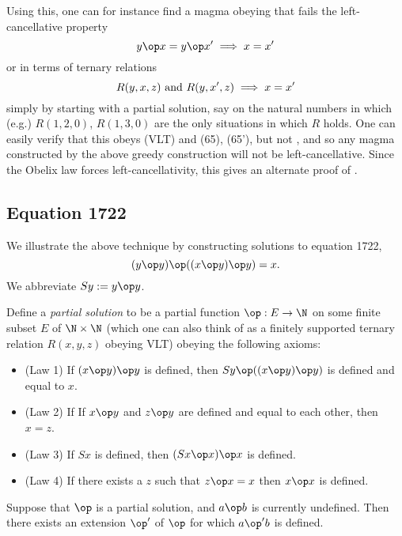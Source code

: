 Using this, one can for instance find a magma obeying  that fails the left-cancellative property
$$ y \op x = y \op x' \implies x=x'$$
or in terms of ternary relations
\begin{equation}\label{left-inject}
   R(y,x,z) \hbox{ and } R(y,x',z) \implies x=x'
\end{equation}
simply by starting with a partial solution, say on the natural numbers in which (e.g.) $R(1,2,0)$, $R(1,3,0)$ are the only situations in which $R$ holds.  One can easily verify that this obeys (VLT) and (65), (65'), but not , and so any magma constructed by the above greedy construction will not be left-cancellative.  Since the Obelix law  forces left-cancellativity, this gives an alternate proof of .

\subsection{Equation 1722}

We illustrate the above technique by constructing solutions to equation 1722,
\begin{equation}\label{1722}
  (y \op y) \op ((x \op y) \op y) = x.
\end{equation}
We abbreviate $Sy := y \op y$.

Define a \emph{partial solution} to be a partial function $\op: E \to \N$ on some finite subset $E$ of $\N \times \N$ (which one can also think of as a finitely supported ternary relation $R(x,y,z)$ obeying VLT) obeying the following axioms:
\begin{itemize}
\item (Law 1) If $(x \op y) \op y$ is defined, then $Sy \op ((x \op y) \op y)$ is defined and equal to $x$.
\item (Law 2) If  If $x \op y$ and $z \op y$ are defined and equal to each other, then $x=z$.
\item (Law 3) If $Sx$ is defined, then $(Sx \op x) \op x$ is defined.
\item (Law 4) If there exists a $z$ such that $z \op x = x$ then $x \op x$ is defined.
\end{itemize}

\begin{lemma}[1722 extension]\label{1722-extension}\leanok{}  Suppose that $\op$ is a partial solution, and $a \op b$ is currently undefined.  Then there exists an extension $\op'$ of $\op$ for which $a \op' b$ is defined.
\end{lemma}

